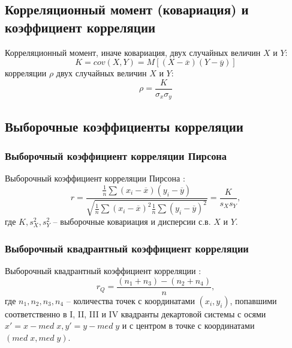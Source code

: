 \documentclass[12pt]{article}
\begin{document}
\subsection{Корреляционный момент (ковариация) и коэффициент корреляции}
Корреляционный момент, иначе ковариация, двух случайных величин $X$ и $Y$:
    \begin{equation}
        K = cov(X, Y) = M\left[(X-\overline{x})(Y-\overline{y})\right]
    \end{equation}
 корреляции $\rho$ двух случайных величин $X$ и $Y$:
    \begin{equation}
        \rho = \frac{K}{\sigma_x\sigma_y}
    \end{equation}

\subsection{Выборочные коэффициенты корреляции}
    
    \subsubsection{Выборочный коэффициент корреляции Пирсона}
    Выборочный коэффициент корреляции Пирсона \cite{theory}:
    \begin{equation}
        r = \frac{\frac{1}{n} \sum (x_i - \overline{x})(y_i - \overline{y})}{\sqrt{\frac{1}{n} \sum (x_i - \overline{x})^2 \frac{1}{n} \sum (y_i - \overline{y})^2}} = \frac{K}{s_Xs_Y},
    \label{pierson}
    \end{equation}
    где $K, s_X^2, s_Y^2$ -- выборочные ковариация и дисперсии с.в. $X$ и $Y$.

    \subsubsection{Выборочный квадрантный коэффициент корреляции}
    Выборочный квадрантный коэффициент корреляции \cite{theory}:
        \begin{equation}
        r_Q = \frac{(n_1+n_3) - (n_2 + n_4)}{n}, 
        \label{quadrant}
        \end{equation} 
    где $n_1, n_2, n_3, n_4$ -- количества точек с координатами $(x_i, y_i)$, попавшими соответственно в I, II, III и IV квадранты декартовой системы с осями $x' = x - med \; x, y' = y - med \; y$ и с центром в точке с координатами $(med \; x, med \; y)$.
\end{document}
